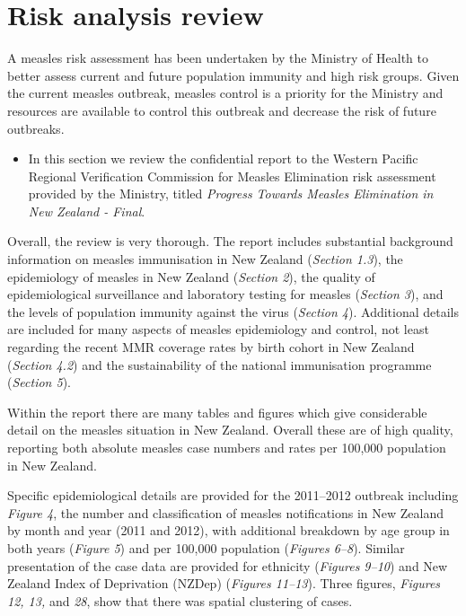 \documentclass{article}
\begin{document}
\section{Risk analysis review}

A measles risk assessment has been undertaken by the Ministry of Health to better assess current and future population immunity and high risk groups. Given the current measles outbreak, measles control is a priority for the Ministry and resources are available to control this outbreak and decrease the risk of future outbreaks.
\begin{itemize}
\item In this section we review the confidential report to the Western Pacific Regional Verification Commission for Measles Elimination risk assessment provided by the Ministry, titled \emph {Progress Towards Measles Elimination in New Zealand - Final}.
\end{itemize}

Overall, the review is very thorough. The report includes substantial background information on measles immunisation in New Zealand (\emph{Section 1.3}), the epidemiology of measles in New Zealand (\emph{Section 2}), the quality of epidemiological surveillance and laboratory testing for measles (\emph{Section 3}), and the levels of population immunity against the virus (\emph{Section 4}). Additional details are included for many aspects of measles epidemiology and control, not least regarding the recent MMR coverage rates by birth cohort in New Zealand (\emph{Section 4.2}) and the sustainability of the national immunisation programme (\emph{Section 5}).

Within the report there are many tables and figures which give considerable detail on the measles situation in New Zealand. Overall these are of high quality, reporting both absolute measles case numbers and rates per 100,000 population in New Zealand.

Specific epidemiological details are provided for the 2011--2012 outbreak including \emph{Figure 4}, the number and classification of measles notifications in New Zealand by month and year (2011 and 2012), with additional breakdown by age group in both years (\emph{Figure 5}) and per 100,000 population (\emph{Figures 6--8}). Similar presentation of the case data are provided for ethnicity (\emph{Figures 9--10}) and New Zealand Index of Deprivation (NZDep) (\emph{Figures 11--13}). Three figures, \emph{Figures 12, 13,} and \emph{28}, show that there was spatial clustering of cases.
\end{document}
